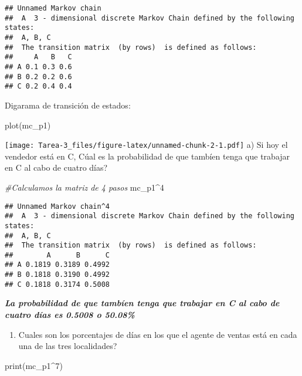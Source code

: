 \documentclass[
]{article}
\newenvironment{Shaded}{\begin{snugshade}}{\end{snugshade}}
\newcommand{\CommentTok}[1]{\textcolor[rgb]{0.56,0.35,0.01}{\textit{#1}}}
\newcommand{\DecValTok}[1]{\textcolor[rgb]{0.00,0.00,0.81}{#1}}
\newcommand{\FunctionTok}[1]{\textcolor[rgb]{0.00,0.00,0.00}{#1}}
\newcommand{\NormalTok}[1]{#1}
\newcommand{\SpecialCharTok}[1]{\textcolor[rgb]{0.00,0.00,0.00}{#1}}
\providecommand{\tightlist}{%
  \setlength{\itemsep}{0pt}\setlength{\parskip}{0pt}}
\begin{document}
\begin{verbatim}
## Unnamed Markov chain 
##  A  3 - dimensional discrete Markov Chain defined by the following states: 
##  A, B, C 
##  The transition matrix  (by rows)  is defined as follows: 
##     A   B   C
## A 0.1 0.3 0.6
## B 0.2 0.2 0.6
## C 0.2 0.4 0.4
\end{verbatim}

Digarama de transición de estados:

\begin{Shaded}
\begin{Highlighting}[]
\FunctionTok{plot}\NormalTok{(mc\_p1)}
\end{Highlighting}
\end{Shaded}

\texttt{[image: Tarea-3\_files/figure-latex/unnamed-chunk-2-1.pdf]} a) Si
hoy el vendedor está en C, Cúal es la probabilidad de que tambíen tenga
que trabajar en C al cabo de cuatro días?

\begin{Shaded}
\begin{Highlighting}[]
\CommentTok{\#Calculamos la matriz de 4 pasos}
\NormalTok{mc\_p1}\SpecialCharTok{\^{}}\DecValTok{4}
\end{Highlighting}
\end{Shaded}

\begin{verbatim}
## Unnamed Markov chain^4 
##  A  3 - dimensional discrete Markov Chain defined by the following states: 
##  A, B, C 
##  The transition matrix  (by rows)  is defined as follows: 
##        A      B      C
## A 0.1819 0.3189 0.4992
## B 0.1818 0.3190 0.4992
## C 0.1818 0.3174 0.5008
\end{verbatim}

\textbf{\emph{La probabilidad de que tambíen tenga que trabajar en C al
cabo de cuatro días es 0.5008 o 50.08\% }}

\begin{enumerate}
\def\labelenumi{\alph{enumi})}
\setcounter{enumi}{1}
\tightlist
\item
  Cuales son los porcentajes de días en los que el agente de ventas está
  en cada una de las tres localidades?
\end{enumerate}

\begin{Shaded}
\begin{Highlighting}[]
\FunctionTok{print}\NormalTok{(mc\_p1}\SpecialCharTok{\^{}}\DecValTok{7}\NormalTok{)}
\end{Highlighting}
\end{Shaded}
\end{document}
